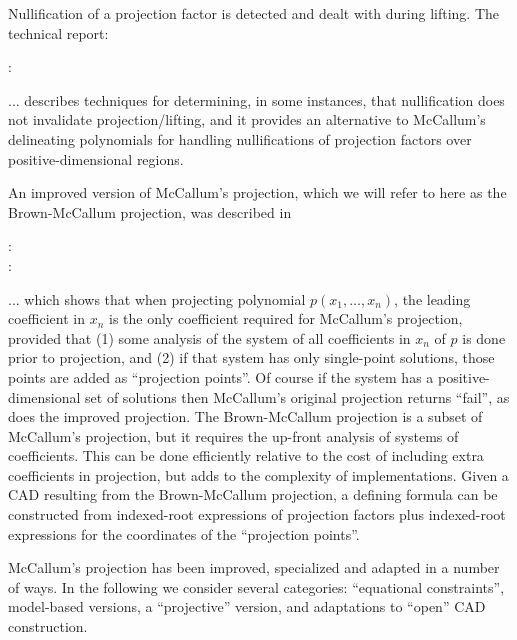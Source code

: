 \documentclass{article}
\begin{document}
Nullification of a projection factor is detected and dealt with during
lifting.  The technical report:
%
\begin{description}
\item[\autocite{Brown:01} :]  
\end{description}
%
... describes techniques for determining, in some instances, that
nullification does not invalidate projection/lifting, and it
provides an alternative to McCallum's delineating polynomials for
handling nullifications of projection factors over
positive-dimensional regions.  

An improved version of McCallum's projection, which we will refer to
here as the Brown-McCallum projection, was described in
%
\begin{description}
\item[\autocite{Brown:00a} :]  
\item[\autocite{Brown:00b} :]  
\end{description}
%
... which shows that when projecting polynomial $p(x_1,\ldots,x_n)$, the leading
coefficient in $x_n$ is the only coefficient required for McCallum's
projection, provided that (1) some analysis of the system of all
coefficients in $x_n$ of $p$ is done prior to projection, and (2) if
that system has only single-point solutions, those points are added
as ``projection points''.  Of course if the system has a
positive-dimensional set of solutions then McCallum's original
projection returns ``fail'', as does the improved projection.
The Brown-McCallum projection is a subset of McCallum's
projection, but it requires the up-front analysis of systems of
coefficients. This can be done efficiently relative to the cost of
including extra coefficients in projection, but adds to the complexity
of implementations. Given a CAD resulting from the
Brown-McCallum projection, a defining formula can be constructed from
indexed-root expressions of projection factors plus indexed-root
expressions for the coordinates of the ``projection points''. 

McCallum's projection has been improved, specialized and adapted in a
number of ways.  In the following we consider several categories:
``equational constraints'', model-based versions, a ``projective''
version, and adaptations to ``open'' CAD construction.
\end{document}
